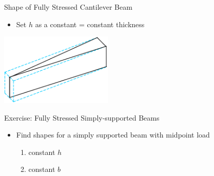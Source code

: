 \documentclass[10pt, svgnames]{beamer}
\begin{document}
\begin{frame}[label={sec:orgde5d8a1}]{Shape of Fully Stressed Cantilever Beam}
\begin{itemize}
\item Set \(h\) as a constant = constant thickness
\end{itemize}

\includegraphics[width=0.4\textwidth]{pictures/fully-stressed-wedge}
\end{frame}

\begin{frame}[label={sec:org3e92343}]{Exercise: Fully Stressed Simply-supported Beams}
\begin{itemize}
\item Find shapes for a simply supported beam with midpoint load
\begin{enumerate}
\item constant \(h\)
\item constant \(b\)
\end{enumerate}
\end{itemize}
\end{frame}
\end{document}
